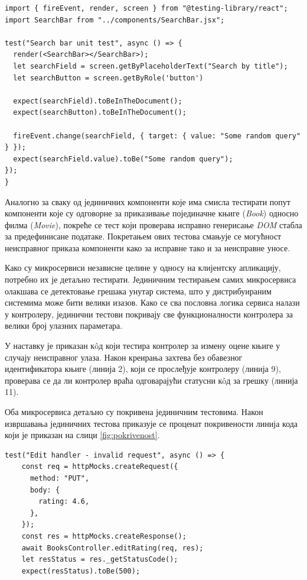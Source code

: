 \documentclass[12pt,oneside]{memoir}
\begin{document}
\begin{lstlisting}[caption=Јединично тестирање \textit{SearchBar} компоненте,
label={lst:searchbarTest},
frame=single]
import { fireEvent, render, screen } from "@testing-library/react";
import SearchBar from "../components/SearchBar.jsx";

test("Search bar unit test", async () => {
  render(<SearchBar></SearchBar>);
  let searchField = screen.getByPlaceholderText("Search by title");
  let searchButton = screen.getByRole('button')
  
  expect(searchField).toBeInTheDocument();
  expect(searchButton).toBeInTheDocument();

  fireEvent.change(searchField, { target: { value: "Some random query" } });
  expect(searchField.value).toBe("Some random query");
});
}
\end{lstlisting}

Аналогно за сваку од јединичних компоненти које има смисла тестирати попут компоненти које су одговорне за приказивање појединачне књиге (\textit{Book}) односно филма (\textit{Movie}), покреће се тест који проверава исправно генерисање \textit{DOM} стабла за предефинисане податаке. Покретањем ових тестова смањује се могућност неисправног приказа компоненти како за исправне тако и за неисправне уносе.

Како су микросервиси независне целине у односу на клијентску апликацију, потребно их је детаљно тестирати. Јединичним тестирањем самих микросервиса олакшава се детектовање грешака унутар система, што у дистрибуираним системима може бити велики изазов. Како се сва пословна логика сервиса налази у контролеру, јединични тестови покривају све функционалности контролера за велики број улазних параметара. 

У наставку је приказан к\^{o}д који тестира контролер за измену оцене књиге у случају неисправног улаза. Након креирања захтева без обавезног идентификатора књиге (линија 2), који се прослеђује контролеру (линија 9), проверава се да ли контролер враћа одговарајући статусни к\^{o}д за грешку (линија 11). 

Оба микросервиса детаљно су покривена јединичним тестовима. Након извршавања јединичних тестова приказује се проценат покривености линија кода који је приказан на слици \ref{fig:pokrivenost}.

\begin{lstlisting}[caption=Јединично тестирање контролера за измену оцене књиге --- неисправан улаз,
label={lst:testController},
frame=single]
test("Edit handler - invalid request", async () => {
    const req = httpMocks.createRequest({
      method: "PUT",
      body: {
        rating: 4.6,
      },
    });
    const res = httpMocks.createResponse();
    await BooksController.editRating(req, res);
    let resStatus = res._getStatusCode();
    expect(resStatus).toBe(500);
\end{lstlisting}
\end{document}
